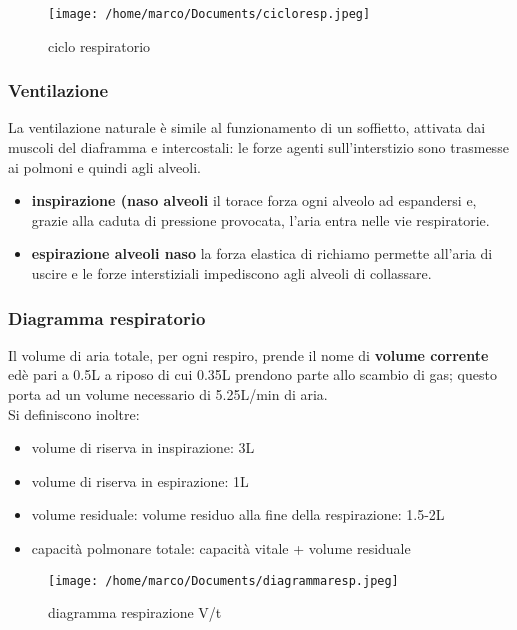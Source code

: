 \documentclass[10pt]{article}
\begin{document}
\begin{figure}[h!]
\centering
\texttt{[image: /home/marco/Documents/cicloresp.jpeg]}
\caption{ciclo respiratorio}
\label{fig:ciclo respiratiorio}
\end{figure}
 \subsubsection{Ventilazione}
 La ventilazione naturale è simile al funzionamento di un soffietto, attivata dai muscoli del diaframma e intercostali: le forze agenti sull'interstizio sono trasmesse ai polmoni e quindi agli alveoli.
 \begin{itemize}
     \item \textbf{inspirazione (naso \textrightarrow alveoli} il torace forza ogni alveolo ad espandersi e, grazie alla caduta di pressione provocata, l'aria entra nelle vie respiratorie.
     \item \textbf{espirazione alveoli \textrightarrow naso} la forza elastica di richiamo permette all'aria di uscire e le forze interstiziali impediscono agli alveoli di collassare. 
 \end{itemize}
 
 \newpage
 
 \subsubsection{Diagramma respiratorio}
 Il volume di aria totale, per ogni respiro, prende il nome di \textbf{volume corrente} edè pari a 0.5L a riposo di cui 0.35L prendono parte allo scambio di gas; questo porta ad un volume necessario di 5.25L/min di aria.\\
 Si definiscono inoltre:
 \begin{itemize}
     \item volume di riserva in inspirazione: 3L
     \item volume di riserva in espirazione: 1L
     \item volume residuale: volume residuo alla fine della respirazione: 1.5-2L
     \item capacità polmonare totale: capacità vitale + volume residuale
 \end{itemize}
 
\begin{figure}[h!]
\centering
\texttt{[image: /home/marco/Documents/diagrammaresp.jpeg]}
\caption{diagramma respirazione V/t}
\label{fig:diagramma resp}
\end{figure}
\end{document}
